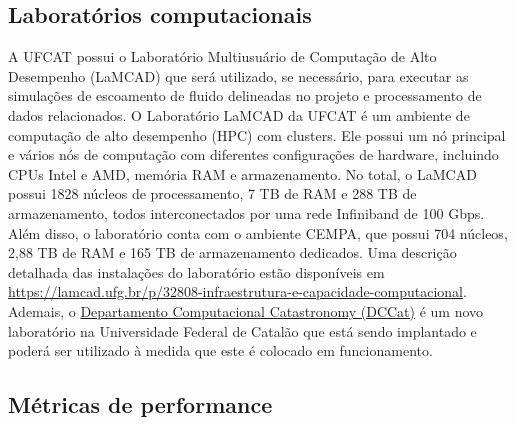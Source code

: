 \documentclass[12pt]{article}
\begin{document}
\subsection{Laboratórios computacionais}
A UFCAT possui o Laboratório Multiusuário de Computação de Alto Desempenho (LaMCAD) que será utilizado, se necessário, para executar as simulações de escoamento de fluido delineadas no projeto e processamento de dados relacionados. O Laboratório LaMCAD da UFCAT é um ambiente de computação de alto desempenho (HPC) com clusters. Ele possui um nó principal e vários nós de computação com diferentes configurações de hardware, incluindo CPUs Intel e AMD, memória RAM e armazenamento. No total, o LaMCAD possui 1828 núcleos de processamento, 7 TB de RAM e 288 TB de armazenamento, todos interconectados por uma rede Infiniband de 100 Gbps. Além disso, o laboratório conta com o ambiente CEMPA, que possui 704 núcleos, 2,88 TB de RAM e 165 TB de armazenamento dedicados.\newline 
Uma descrição detalhada  das instalações do laboratório estão disponíveis em \newline \href{https://lamcad.ufg.br/p/32808-infraestrutura-e-capacidade-computacional}{https://lamcad.ufg.br/p/32808-infraestrutura-e-capacidade-computacional}.\newline
Ademais, o \href{https://dccat.catastronomy.com/press.html}{Departamento Computacional Catastronomy (DCCat)} é um novo laboratório na Universidade Federal de Catalão que está sendo implantado e poderá ser utilizado à medida que este é colocado em funcionamento.
\subsection{Métricas de performance}
\end{document}

